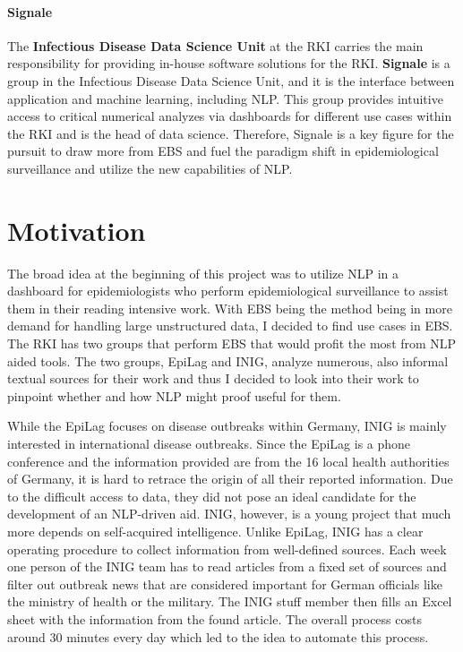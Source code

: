 \paragraph{Signale}
The \textbf{Infectious Disease Data Science Unit} at the RKI carries the main responsibility for providing in-house software solutions for the RKI.
\textbf{Signale} is a group in the Infectious Disease Data Science Unit, and it is the interface between application and machine learning, including NLP.
This group provides intuitive access to critical numerical analyzes via dashboards for different use cases within the RKI and is the head of data science.
Therefore, Signale is a key figure for the pursuit to draw more from EBS and fuel the paradigm shift in epidemiological surveillance and utilize the new capabilities of NLP.




\section{Motivation}
The broad idea at the beginning of this project was to utilize NLP in a dashboard for epidemiologists who perform epidemiological
surveillance to assist them in their reading intensive work.
With EBS being the method being in more demand for handling large unstructured data, I decided to find use cases in EBS.
The RKI has two groups that perform EBS that would profit the most from NLP aided tools. The two groups, EpiLag and INIG, analyze numerous, also informal textual sources for their work and thus I decided to look into their work to pinpoint whether and how NLP might proof useful for them.

While the EpiLag focuses on disease outbreaks within Germany, INIG is mainly interested in international disease outbreaks. Since the EpiLag is a phone conference and the information provided are from the 16 local health authorities of Germany, it is hard to retrace the origin of all their reported information.
Due to the difficult access to data, they did not pose an ideal candidate for the development of an NLP-driven aid.
INIG, however, is a young project that much more depends on self-acquired intelligence.
Unlike EpiLag, INIG has a clear operating procedure to collect information from well-defined sources.
Each week one person of the INIG team has to read articles from a fixed set of sources and filter out outbreak news that are considered important for German officials like the ministry of health or the military.
The INIG stuff member then fills an Excel sheet with the information from the found article.
The overall process costs around 30 minutes every day which led to the idea to automate this process.

